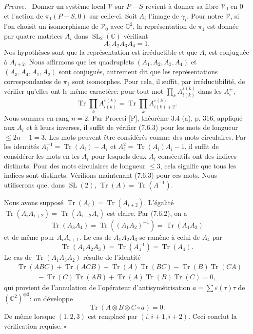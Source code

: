 \documentclass[10pt]{article}
\newcommand{\C}{\mathbb C}
\newcommand{\SL}{\operatorname{SL}}
\newcommand{\Tr}{\operatorname{Tr}}
\theoremstyle{deligne}
\newenvironment{proofdel}[1][Preuve.]{\textit{#1}\ }{\hfill$\square$}
\begin{document}
\begin{proofdel}
Donner un système local $\mathcal V$ sur $P-S$ revient à donner sa fibre $\mathcal V_0$ en $0$ et l'action de $\pi_1(P-S,0)$ sur celle-ci. Soit $A_i$ l'image de $\gamma_i$. Pour notre $\mathcal V$, si l'on choisit un isomorphisme de $\mathcal V_0$ avec $\C^2$, la représentation de $\pi_1$ est donnée par quatre matrices $A_i$ dans $\SL_2(\C)$ vérifiant
\begin{equation}\tag{7.6.2}
A_1A_2A_3A_4=1.
\end{equation}
Nos hypothèses sont que la représentation est irréductible et que $A_i$ est conjuguée à $A_{i+2}$. Nous affirmons que les quadruplets $(A_1,A_2,A_3,A_4)$ et $(A_3,A_4,A_1,A_2)$ sont conjugués, autrement dit que les représentations correspondantes de $\pi_1$ sont isomorphes. Pour cela, il suffit, par irréductibilité, de vérifier qu'elles ont le même caractère: pour tout mot $\prod_k A_{i(k)}^{\varepsilon(k)}$ dans les $A_i^{\pm}$,
\begin{equation}\tag{7.6.3}
\Tr\prod_k A_{i(k)}^{\varepsilon(k)}=\Tr\prod_k A_{i(k)+2}^{\varepsilon(k)}.
\end{equation}
Nous sommes en rang $n=2$. Par Procesi [P], théorème 3.4 (a), p. 316, appliqué aux $A_i$ et à leurs inverses, il suffit de vérifier (7.6.3) pour les mots de longueur $\le2n-1=3$. Les mots peuvent être considérés comme des mots circulaires. Par les identités $A_i^{-1}=\Tr(A_i)-A_i$ et $A_i^2=\Tr(A_i)A_i-1$, il suffit de considérer les mots en les $A_i$ pour lesquels deux $A_i$ consécutifs ont des indices distincts. Pour des mots circulaires de longueur $\le3$, cela signifie que tous les indices sont distincts. Vérifions maintenant (7.6.3) pour ces mots. Nous utiliserons que, dans $\SL(2)$, $\Tr(A)=\Tr(A^{-1})$.

Nous avons supposé $\Tr(A_i)=\Tr(A_{i+2})$. L'égalité $\Tr(A_iA_{i+2})=\Tr(A_{i+2}A_i)$ est claire. Par (7.6.2), on a
\[
\Tr(A_3A_4)=\Tr((A_1A_2)^{-1})=\Tr(A_1A_2)
\]
et de même pour $A_iA_{i+1}$. Le cas de $A_1A_2A_3$ se ramène à celui de $A_4$ par
\[
\Tr(A_1A_2A_3)=\Tr(A_4^{-1})=\Tr(A_4).
\]
Le cas de $\Tr(A_1A_3A_2)$ résulte de l'identité
\begin{equation}\tag{7.6.4}
\begin{aligned}
&\Tr(ABC)+\Tr(ACB)-\Tr(A)\Tr(BC)-\Tr(B)\Tr(CA)\\
&\hspace{3em}-\Tr(C)\Tr(AB)+\Tr(A)\Tr(B)\Tr(C)=0,
\end{aligned}
\end{equation}
qui provient de l'annulation de l'opérateur d'antisymétrisation $a=\sum\varepsilon(\tau)\tau$ de $(\C^2)^{\otimes3}$: on développe
\[
\Tr(A\otimes B\otimes C\circ a)=0.
\]
De même lorsque $(1,2,3)$ est remplacé par $(i,i+1,i+2)$. Ceci conclut la vérification requise.
\end{proofdel}
\end{document}

